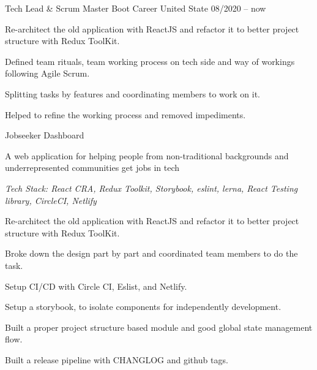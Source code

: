 \begin{cventries}
  \cventry
    {Tech Lead \& Scrum Master} %
    {Boot Career} %
    {United State} %
    {08/2020 -- now} %
    {
      \begin{cvitems} %
        \item {Re-architect the old application with ReactJS and refactor it to better project structure with Redux ToolKit.}
        \item {Defined team rituals, team working process on tech side and way of workings following Agile Scrum.}
        \item {Splitting tasks by features and coordinating members to work on it.}
        \item {Helped to refine the working process and removed impediments. }
      \end{cvitems}
    }

 \cventry
    {Jobseeker Dashboard} %
    {} %
    {} %
    {} %
    {
      \begin{cvitems} %
         \item {A web application for helping people from non-traditional backgrounds and underrepresented communities get jobs in tech}
        \item[] {\it Tech Stack: React CRA, Redux Toolkit, Storybook, eslint, lerna, React Testing library, CircleCI, Netlify}
        \item {Re-architect the old application with ReactJS and refactor it to better project structure with Redux ToolKit.}
        \item {Broke down the design part by part and coordinated team members to do the task.}
        \item {Setup CI/CD with Circle CI, Eslist, and Netlify.}
        \item {Setup a storybook, to isolate components for independently development.}
        \item {Built a proper project structure based module and good global state management flow.}
        \item {Built a release pipeline with CHANGLOG and github tags.}
      \end{cvitems}
    }
    

\end{cventries}
